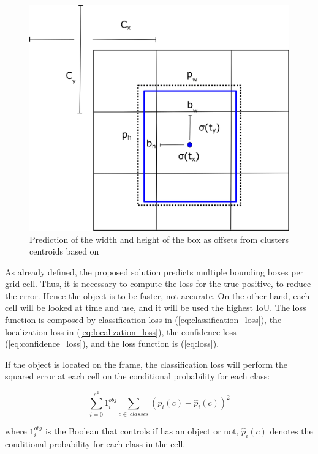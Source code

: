 \begin{figure}[H]
\centering
\includegraphics[scale=0.5]{imagens/anchor.png}
\caption{Prediction of the width and height of the box as offsets from clusters centroids based on \cite{redmon2017yolo9000}}
\label{fig:anchor}
\end{figure}

As already defined, the proposed solution predicts multiple bounding boxes per grid cell. Thus, it is necessary to compute the loss for the true positive, to reduce the error. Hence the object is to be faster, not accurate. On the other hand, each cell will be looked at time and use, and it will be used the highest IoU. The loss function is composed by classification loss in (\ref{eq:classification_loss}), the localization loss in (\ref{eq:localization_loss}), the confidence loss (\ref{eq:confidence_loss}), and the loss function is (\ref{eq:loss}). 

If the object is located on the frame, the classification loss will perform the squared error at each cell on the conditional probability for each class: 

\begin{equation}
\label{eq:classification_loss}
    \sum_{i=0}^{s^2}1^{obj}_i \sum_{c\in~classes} \left ( p_i\left ( c \right )-\hat{p}_i\left ( c \right )\right )^2
\end{equation}

where $1^{obj}_i$ is the Boolean that controls if has an object or not, $\hat{p}_i\left ( c \right )$ denotes the conditional probability for each class in the cell.

